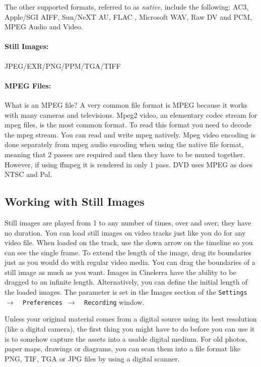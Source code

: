 The other supported formats, referred to as \textit{native},  include the following:
AC3, 
Apple/SGI AIFF,
Sun/NeXT AU,
FLAC ,
Microsoft WAV,
Raw DV and PCM,
MPEG Audio and Video.

\paragraph{Still Images:}  JPEG/EXR/PNG/PPM/TGA/TIFF

\paragraph{MPEG Files:} 
What is an MPEG file?  A very common file format is MPEG because it works with many cameras and televisions.  Mpeg2 video, an elementary codec stream for mpeg files, is the most common format.  To read this format you need to decode the mpeg stream.  You can read and write mpeg natively.  Mpeg video encoding is done separately from mpeg audio encoding when using the native file format, meaning that 2 passes are required and then they have to be muxed together.  However, if using ffmpeg it is rendered in only 1 pass.  DVD uses MPEG as does NTSC and Pal.

\subsection{Working with Still Images}%
\label{sub:working_with_still_images}

Still images are played from 1 to any number of times, over and over; they have no duration. You can load still images on video tracks just like you do for any video file. When loaded on the track, use the down arrow on the timeline so you can see the single frame. To extend the length of the image, drag its boundaries just as you would do with regular video media. You can drag the boundaries of a still image as much as you want. Images in Cinelerra have the ability to be dragged to an infinite length. Alternatively, you can define the initial length of the loaded images. The parameter is set in the Images section of the \texttt{Settings $\rightarrow$ ~Preferences $\rightarrow$ ~Recording} window.

Unless your original material comes from a digital source using its best resolution (like a digital camera), the first thing you might have to do before you can use it is to somehow capture the assets into a usable digital medium. For old photos, paper maps, drawings or diagrams, you can scan them into a file format like PNG, TIF, TGA or JPG files by using a digital scanner.

